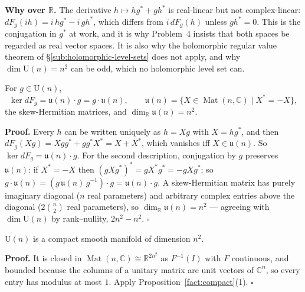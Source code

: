 \documentclass[11pt]{report}
\makeatletter
\newcounter{thmcounter}[section]
\renewenvironment{proof}[1][Proof]{\noindent\textbf{#1.} }{\hfill$\square$\par\vspace{5pt}}
\newcommand{\thmlabel}[1]{\edef\@currentlabel{\arabic{section}.\arabic{thmcounter}}\label{#1}}
\newcommand{\Ugp}{\mathrm{U}}
\DeclareMathOperator{\Mat}{Mat}
\newcommand{\leeref}[1]{\par\smallskip{\raggedleft\footnotesize\textsc{Lee}:\ #1\par}}
\makeatother
\begin{document}
\begin{rembox}\label{rem:vector-spaces-7}
\textbf{Why over $\mathbb{R}$.} The derivative $h \mapsto hg^* + gh^*$ is real-linear but not complex-linear: $dF_g(ih) = i\,hg^* - i\,gh^*$, which differs from $i\,dF_g(h)$ unless $gh^* = 0$. This is the conjugation in $g^*$ at work, and it is why Problem~4 insists that both spaces be regarded as real vector spaces. It is also why the holomorphic regular value theorem of \S\ref{sub:holomorphic-level-sets} does not apply, and why $\dim \Ugp(n) = n^2$ can be odd, which no holomorphic level set can.
\end{rembox}

\begin{propbox}\thmlabel{prop:Un-kernel}
For $g \in \Ugp(n)$,
\[
\ker dF_g = \mathfrak{u}(n)\cdot g = g \cdot \mathfrak{u}(n), \qquad \mathfrak{u}(n) = \{X \in \Mat(n,\mathbb{C}) \mid X^* = -X\},
\]
the skew-Hermitian matrices, and $\dim_{\mathbb{R}} \mathfrak{u}(n) = n^2$.
\end{propbox}

\begin{proof}
Every $h$ can be written uniquely as $h = Xg$ with $X = hg^*$, and then $dF_g(Xg) = Xgg^* + gg^*X^* = X + X^*$, which vanishes iff $X \in \mathfrak{u}(n)$. So $\ker dF_g = \mathfrak{u}(n)\cdot g$. For the second description, conjugation by $g$ preserves $\mathfrak{u}(n)$: if $X^* = -X$ then $(gXg^*)^* = gX^*g^* = -gXg^*$; so $g \cdot \mathfrak{u}(n) = (g\,\mathfrak{u}(n)\,g^{-1})\cdot g = \mathfrak{u}(n)\cdot g$. A skew-Hermitian matrix has purely imaginary diagonal ($n$ real parameters) and arbitrary complex entries above the diagonal ($2\binom n2$ real parameters), so $\dim_{\mathbb{R}}\mathfrak{u}(n) = n^2$ --- agreeing with $\dim \Ugp(n)$ by rank--nullity, $2n^2 - n^2$.
\end{proof}

\begin{corbox}[$\Ugp(n)$ Is Compact]\thmlabel{cor:Un-compact}
$\Ugp(n)$ is a compact smooth manifold of dimension $n^2$.
\leeref{Example 7.29}
\end{corbox}

\begin{proof}
It is closed in $\Mat(n,\mathbb{C}) \cong \mathbb{R}^{2n^2}$ as $F^{-1}(I)$ with $F$ continuous, and bounded because the columns of a unitary matrix are unit vectors of $\mathbb{C}^n$, so every entry has modulus at most $1$. Apply Proposition~\ref{fact:compact}(1).
\end{proof}
\end{document}
